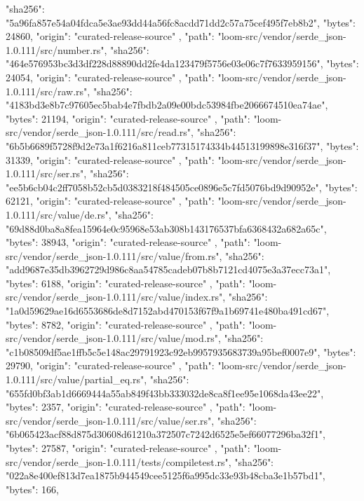 {{      "sha256": "5a96fa857e54a04fdca5e3ae93dd44a56fc8acdd71dd2c57a75cef495f7eb8b2",
      "bytes": 24860,
      "origin": "curated-release-source"
    },
    {
      "path": "loom-src/vendor/serde_json-1.0.111/src/number.rs",
      "sha256": "464e576953bc3d3df228d88890dd2fe4da123479f5756e03e06c7f7633959156",
      "bytes": 24054,
      "origin": "curated-release-source"
    },
    {
      "path": "loom-src/vendor/serde_json-1.0.111/src/raw.rs",
      "sha256": "4183bd3e8b7c97605ec5bab4e7fbdb2a09e00bdc53984fbe2066674510ea74ae",
      "bytes": 21194,
      "origin": "curated-release-source"
    },
    {
      "path": "loom-src/vendor/serde_json-1.0.111/src/read.rs",
      "sha256": "6b5b6689f5728f9d2e73a1f6216a811ceb77315174334b44513199898e316f37",
      "bytes": 31339,
      "origin": "curated-release-source"
    },
    {
      "path": "loom-src/vendor/serde_json-1.0.111/src/ser.rs",
      "sha256": "ee5b6cb04c2ff7058b52cb5d0383218f484505ce0896e5c7fd5076bd9d90952e",
      "bytes": 62121,
      "origin": "curated-release-source"
    },
    {
      "path": "loom-src/vendor/serde_json-1.0.111/src/value/de.rs",
      "sha256": "69d88d0ba8a8fea15964e0c95968e53ab308b143176537bfa6368432a682a65c",
      "bytes": 38943,
      "origin": "curated-release-source"
    },
    {
      "path": "loom-src/vendor/serde_json-1.0.111/src/value/from.rs",
      "sha256": "add9687e35db3962729d986c8aa54785cadeb07b8b7121cd4075e3a37ecc73a1",
      "bytes": 6188,
      "origin": "curated-release-source"
    },
    {
      "path": "loom-src/vendor/serde_json-1.0.111/src/value/index.rs",
      "sha256": "1a0d59629ae16d6553686de8d7152abd470153f67f9a1b69741e480ba491cd67",
      "bytes": 8782,
      "origin": "curated-release-source"
    },
    {
      "path": "loom-src/vendor/serde_json-1.0.111/src/value/mod.rs",
      "sha256": "c1b08509df5ae1ffb5c5e148ac29791923c92eb9957935683739a95bef0007e9",
      "bytes": 29790,
      "origin": "curated-release-source"
    },
    {
      "path": "loom-src/vendor/serde_json-1.0.111/src/value/partial_eq.rs",
      "sha256": "655fd0bf3ab1d6669444a55ab849f43bb333032de8ca8f1ee95e1068da43ee22",
      "bytes": 2357,
      "origin": "curated-release-source"
    },
    {
      "path": "loom-src/vendor/serde_json-1.0.111/src/value/ser.rs",
      "sha256": "6b065423acf88d875d30608d61210a372507c7242d6525e5ef66077296ba32f1",
      "bytes": 27587,
      "origin": "curated-release-source"
    },
    {
      "path": "loom-src/vendor/serde_json-1.0.111/tests/compiletest.rs",
      "sha256": "022a8e400ef813d7ea1875b944549cee5125f6a995dc33e93b48cba3e1b57bd1",
      "bytes": 166,
}}
